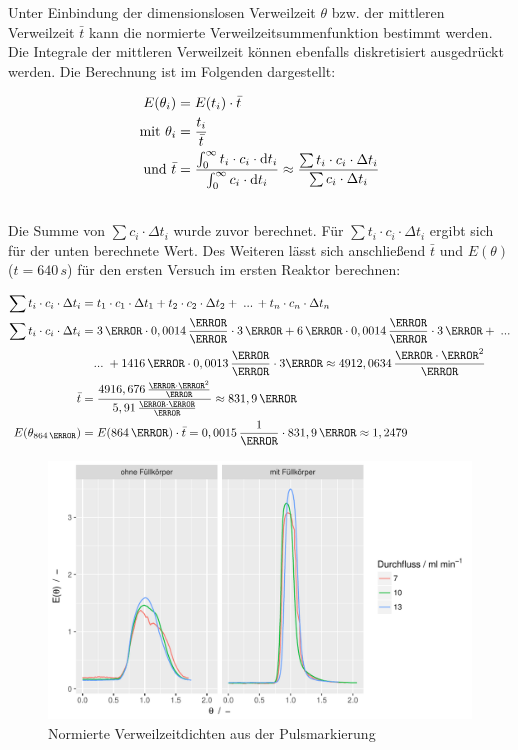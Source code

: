 \documentclass[12pt,liststotoc]{report}
\begin{document}
Unter Einbindung der dimensionslosen Verweilzeit $\theta$ bzw. der mittleren Verweilzeit $\bar{t}$ kann die normierte Verweilzeitsummenfunktion bestimmt werden. Die Integrale der mittleren Verweilzeit können ebenfalls diskretisiert ausgedrückt werden. Die Berechnung ist im Folgenden dargestellt:

\begin{align}
E(\theta_i) =&\; E(t_i) \cdot \bar{t} \\
\text{mit }\theta_i=&\;\frac{t_i}{\bar{t}}\\
\text{und }\bar{t} = &\;\frac{\int_{0}^{\infty}t_i\cdot c_i \cdot\text{d}t_i}{\int_{0}^{\infty}c_i \cdot\text{d}t_i} \approx \frac{\sum t_i\cdot c_i \cdot \Delta t_i}{\sum c_i \cdot \Delta t_i} \\
\notag
\end{align} 
\noindent
Die Summe von $\sum c_i \cdot \Delta t_i$ wurde zuvor berechnet. Für $\sum t_i\cdot c_i \cdot \Delta t_i$ ergibt sich für der unten berechnete Wert. Des Weiteren lässt sich anschließend $\bar{t}$ und $E(\theta)$ ($t= 640\,s$) für den ersten Versuch im ersten Reaktor berechnen:

\begin{align*}
\sum t_i\cdot c_i \cdot \Delta t_i =&\;t_1\cdot c_1 \cdot \Delta t_1 + t_2\cdot c_2 \cdot \Delta t_2+\;...\,+t_n\cdot c_n \cdot \Delta t_n \\
\sum t_i\cdot c_i \cdot \Delta t_i =&\; 3\,\s\cdot 0,0014\,\frac{\mole}{\litre}\cdot 3\,\s + 6\,\s\cdot 0,0014\,\frac{\mole}{\litre}\cdot 3\,\s+\;...\\
&...\;+ 1416\,\s\cdot 0,0013\,\frac{\mole}{\litre}\cdot 3\s \approx 4912,0634\,\frac{\mole\cdot\s^2}{\litre}\\
\bar{t} =&\; \frac{4916,676\,\frac{\mole\cdot\s^2}{\litre}}{5,91\,\frac{\mole\cdot\s}{\litre}} \approx 831,9\,\s\\
E(\theta_{864\,\s}) =&\; E(864\,\s)\cdot\bar{t} = 0,0015\,\frac{1}{\s} \cdot 831,9\,\s \approx 1,2479\\
\end{align*} 


\begin{figure}[H]
\centering
\includegraphics[width=1\textwidth]{Graphics/E_theta_stoss.pdf}
\caption[Normierte Verweilzeitdichte Pulsmarkierungen]{Normierte Verweilzeitdichten aus der Pulsmarkierung}
\label{dichte_stoß_norm}
\end{figure}
\noindent
\end{document}
